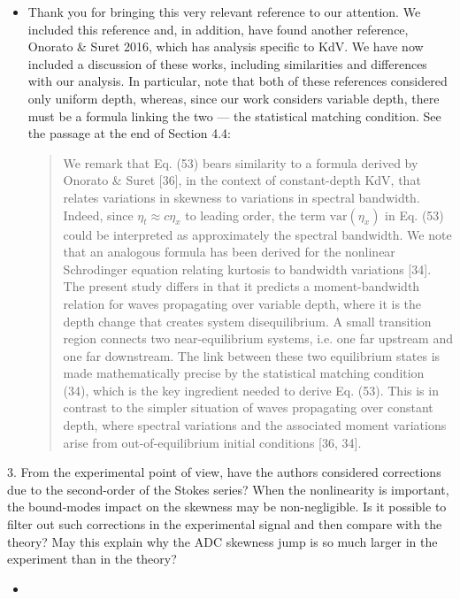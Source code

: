\documentclass[11pt]{article}
\newcommand{\comment}[1]{{\color{blue} #1}}
\begin{document}
\begin{itemize}
\item Thank you for bringing this very relevant reference to our attention. We included this reference and, in addition, have found another reference, Onorato \& Suret 2016, which has analysis specific to KdV. We have now included a discussion of these works, including similarities and differences with our analysis. In particular, note that both of these references considered only uniform depth, whereas, since our work considers variable depth, there must be a formula linking the two ---  the statistical matching condition. See the passage at the end of Section 4.4:

\begin{quotation}
We remark that Eq. (53) bears similarity to a formula derived by Onorato \& Suret [36], in the context of constant-depth KdV, that relates variations in skewness to variations in spectral bandwidth. Indeed, since $\eta_t \approx c \eta_x$ to leading order, the term $\text{var}(\eta_x)$ in Eq. (53) could be interpreted as approximately the spectral bandwidth. We note that an analogous formula has been derived for the nonlinear Schrodinger equation relating kurtosis to bandwidth variations [34]. The present study differs in that it predicts a moment-bandwidth relation for waves propagating over variable depth, where it is the depth change that creates system disequilibrium. A small transition region connects two near-equilibrium systems, i.e. one far upstream and one far downstream. The link between these two equilibrium states is made mathematically precise by the statistical matching condition (34), which is the key ingredient needed to derive Eq. (53). This is in contrast to the simpler situation of waves propagating over constant depth, where spectral variations and the associated moment variations arise from out-of-equilibrium initial conditions [36, 34].
\end{quotation}

\end{itemize}

\noindent
\comment{
3. From the experimental point of view, have the authors considered corrections due to the second-order of the Stokes series? When the nonlinearity is important, the bound-modes impact on the skewness may be non-negligible. Is it possible to filter out such corrections in the experimental signal and then compare with the theory? May this explain why the ADC skewness jump is so much larger in the experiment than in the theory?
}

\begin{itemize}
\item
\end{itemize}

\end{document}
